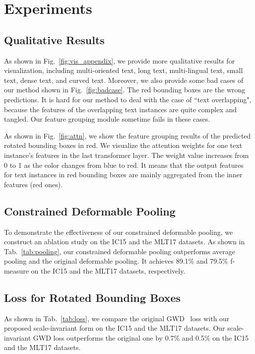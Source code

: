 \documentclass[10pt,twocolumn,letterpaper]{article}
\begin{document}
\section{Experiments}



\subsection{Qualitative Results}
As shown in Fig.~\ref{fig:vis_appendix}, we provide more qualitative results for visualization, including multi-oriented text, long text, multi-lingual text, small text, dense text, and curved text.
Moreover, we also provide some bad cases of our method shown in Fig.~\ref{fig:badcase}. The red bounding boxes are the wrong predictions. It is hard for our method to deal with the case of ``text overlapping", because the features of the overlapping text instances are quite complex and tangled. Our feature grouping module sometime fails in these cases.

As shown in Fig.~\ref{fig:attn}, we show the feature grouping results of the predicted rotated bounding boxes in red. We visualize the attention weights for one text instance's features in the last transformer layer.
The weight value increases from 0 to 1 as the color changes from blue to red.
It means that the output features for text instances in red bounding boxes are mainly aggregated from the inner features (red ones).

\subsection{Constrained Deformable Pooling}
To demonstrate the effectiveness of our constrained deformable pooling, we construct an ablation study on the IC15 and the MLT17 datasets.
As shown in Tab.~\ref{tab:pooling}, our constrained deformable pooling outperforms average pooling and the original deformable pooling.
It achieves 89.1\% and 79.5\% f-measure on the IC15 and the MLT17 datasets, respectively.



\subsection{Loss for Rotated Bounding Boxes}
As shown in Tab.~\ref{tab:loss}, we compare the original GWD~\cite{GWD} loss with our proposed scale-invariant form on the IC15 and the MLT17 datasets.
Our scale-invariant GWD loss outperforms the original one by 0.7\% and 0.5\% on the IC15 and the MLT17 datasets.
\end{document}
